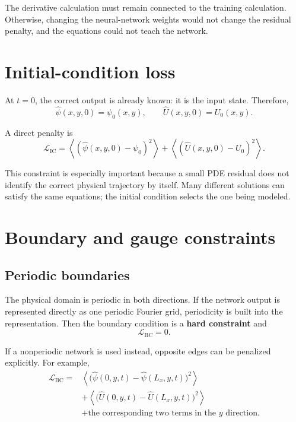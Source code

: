 \documentclass[11pt]{article}
\newcommand{\avg}[1]{\left\langle #1\right\rangle}
\newcommand{\Lic}{\mathcal L_{\mathrm{IC}}}
\newcommand{\Lbc}{\mathcal L_{\mathrm{BC}}}
\begin{document}
The derivative calculation must remain connected to the training calculation. Otherwise, changing the neural-network weights would not change the residual penalty, and the equations could not teach the network.

\section{Initial-condition loss}

At $t=0$, the correct output is already known: it is the input state. Therefore,
\begin{equation}
\widehat\psi(x,y,0)=\psi_0(x,y),
\qquad
\widehat U(x,y,0)=U_0(x,y).
\end{equation}

A direct penalty is
\begin{equation}
\boxed{
\Lic
=\avg{(\widehat\psi(x,y,0)-\psi_0)^2}
+\avg{(\widehat U(x,y,0)-U_0)^2}.
}
\label{eq:lic}
\end{equation}

This constraint is especially important because a small PDE residual does not identify the correct physical trajectory by itself. Many different solutions can satisfy the same equations; the initial condition selects the one being modeled.

\section{Boundary and gauge constraints}

\subsection{Periodic boundaries}

The physical domain is periodic in both directions. If the network output is represented directly as one periodic Fourier grid, periodicity is built into the representation. Then the boundary condition is a \textbf{hard constraint} and
\begin{equation}
\boxed{\Lbc=0.}
\end{equation}

If a nonperiodic network is used instead, opposite edges can be penalized explicitly. For example,
\begin{align}
\Lbc={}&\avg{\bigl(\widehat\psi(0,y,t)-\widehat\psi(L_x,y,t)\bigr)^2}\\
&+\avg{\bigl(\widehat U(0,y,t)-\widehat U(L_x,y,t)\bigr)^2}\\
&+\text{the corresponding two terms in the $y$ direction}.
\end{align}
\end{document}
